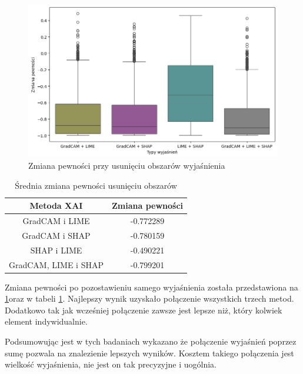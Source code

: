 \begin{figure}[h]
	\centering\includegraphics[width=.9\textwidth]{img/combine_confidence_no_exp_or}
	\caption{Zmiana pewności przy usunięciu obszarów wyjaśnienia}  \label{rys:combineandconfidenceorno}
\end{figure}
\begin{table}[h]
	\centering
	\begin{tabular}{|c|c|}
		\hline
		\textbf{Metoda XAI}  & Zmiana pewności \\
		\hline
		GradCAM i LIME       & -0.772289       \\
		\hline
		GradCAM i SHAP       & -0.780159       \\
		\hline
		SHAP i LIME          & -0.490221       \\
		\hline
		GradCAM, LIME i SHAP & -0.799201       \\
		\hline
	\end{tabular}
	\caption{Średnia zmiana pewności usunięciu obszarów}
	\label{tab:combineandconfidenceorno}
\end{table}
Zmiana pewności po pozostawieniu samego wyjaśnienia została przedstawiona na \ref{rys:combineandconfidenceorno}oraz w tabeli \ref{tab:combineandconfidenceorno}.
Najlepszy wynik uzyskało połączenie wszystkich trzech metod.
Dodatkowo tak jak wcześniej połączenie zawsze jest lepsze niż, który kolwiek element indywidualnie.

\vspace{1cm}
Podsumowując jest w tych badaniach wykazano że połączenie wyjaśnień poprzez sumę pozwala na znalezienie lepszych wyników.
Kosztem takiego połączenia jest wielkość wyjaśnienia, nie jest on tak precyzyjne i uogólnia.
